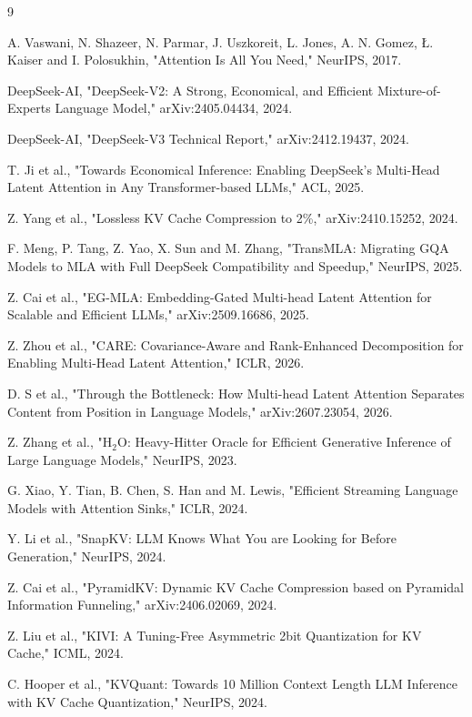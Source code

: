 \documentclass[11pt]{article}
\begin{document}
\begin{thebibliography}{9}

 A. Vaswani, N. Shazeer, N. Parmar, J. Uszkoreit, L. Jones, A. N. Gomez, Ł. Kaiser and I. Polosukhin, "Attention Is All You Need," NeurIPS, 2017.

 DeepSeek-AI, "DeepSeek-V2: A Strong, Economical, and Efficient Mixture-of-Experts Language Model," arXiv:2405.04434, 2024.

 DeepSeek-AI, "DeepSeek-V3 Technical Report," arXiv:2412.19437, 2024.

 T. Ji et al., "Towards Economical Inference: Enabling DeepSeek's Multi-Head Latent Attention in Any Transformer-based LLMs," ACL, 2025.

 Z. Yang et al., "Lossless KV Cache Compression to 2\%," arXiv:2410.15252, 2024.

 F. Meng, P. Tang, Z. Yao, X. Sun and M. Zhang, "TransMLA: Migrating GQA Models to MLA with Full DeepSeek Compatibility and Speedup," NeurIPS, 2025.

 Z. Cai et al., "EG-MLA: Embedding-Gated Multi-head Latent Attention for Scalable and Efficient LLMs," arXiv:2509.16686, 2025.

 Z. Zhou et al., "CARE: Covariance-Aware and Rank-Enhanced Decomposition for Enabling Multi-Head Latent Attention," ICLR, 2026.

 D. S et al., "Through the Bottleneck: How Multi-head Latent Attention Separates Content from Position in Language Models," arXiv:2607.23054, 2026.

 Z. Zhang et al., "H$_2$O: Heavy-Hitter Oracle for Efficient Generative Inference of Large Language Models," NeurIPS, 2023.

 G. Xiao, Y. Tian, B. Chen, S. Han and M. Lewis, "Efficient Streaming Language Models with Attention Sinks," ICLR, 2024.

 Y. Li et al., "SnapKV: LLM Knows What You are Looking for Before Generation," NeurIPS, 2024.

 Z. Cai et al., "PyramidKV: Dynamic KV Cache Compression based on Pyramidal Information Funneling," arXiv:2406.02069, 2024.

 Z. Liu et al., "KIVI: A Tuning-Free Asymmetric 2bit Quantization for KV Cache," ICML, 2024.

 C. Hooper et al., "KVQuant: Towards 10 Million Context Length LLM Inference with KV Cache Quantization," NeurIPS, 2024.


\end{thebibliography}
\end{document}
